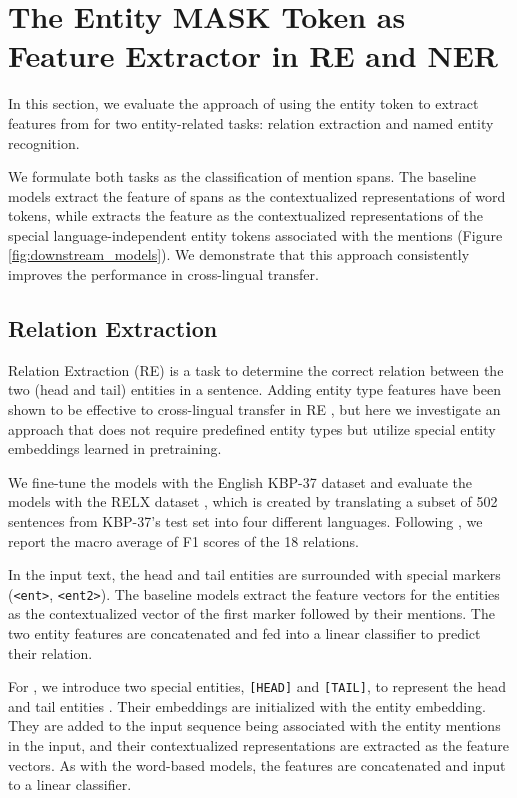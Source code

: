 \documentclass[11pt]{article}
\newcommand{\minisection}[1]{\noindent{\bf {#1}.}}
\begin{document}
\section{The Entity MASK Token as Feature Extractor in RE and  NER}
\label{sec:experiment-rc-ner}
In this section, we evaluate the approach of using the entity \mask{} token to extract features from \mlukeE{} for two entity-related tasks: relation extraction and named entity recognition.

We formulate both tasks as the classification of mention spans.
The baseline models extract the feature of spans as the contextualized representations of word tokens, while \mlukeE{} extracts the feature as the contextualized representations of the special language-independent entity tokens associated with the mentions (Figure \ref{fig:downstream_models}).
We demonstrate that this approach consistently improves the performance in cross-lingual transfer.

\subsection{Relation Extraction}
\label{subsec:re}
Relation Extraction (RE) is a task to determine the correct relation between the two (head and tail) entities in a sentence.
Adding entity type features have been shown to be effective to cross-lingual transfer in RE \citep{subburathinam-etal-2019-cross,ahmad2020gatf}, but here we investigate an approach that does not require predefined entity types but utilize special entity embeddings learned in pretraining.

\minisection{Datasets}
We fine-tune the models with the English KBP-37 dataset \citep{Zhang2015RelationCV} and evaluate the models with the RELX dataset \citep{koksal-ozgur-2020-relx}, which is created by translating a subset of 502 sentences from KBP-37’s test set into four different languages.
Following \citet{koksal-ozgur-2020-relx}, we report the macro average of F1 scores of the 18 relations.

\minisection{Models}
In the input text, the head and tail entities are surrounded with special markers (\texttt{<ent>}, \texttt{<ent2>}).
The baseline models extract the feature vectors for the entities as the contextualized vector of the first marker followed by their mentions. The two entity features are concatenated and fed into a linear classifier to predict their relation.

For \mlukeE{}, we introduce two special entities, \texttt{[HEAD]} and \texttt{[TAIL]}, to represent the head and tail entities \citep{yamada-etal-2020-luke}. Their embeddings are initialized with the entity \mask{} embedding.
They are added to the input sequence being associated with the entity mentions in the input, and their contextualized representations are extracted as the feature vectors.
As with the word-based models, the features are concatenated and input to a linear classifier.
\end{document}
